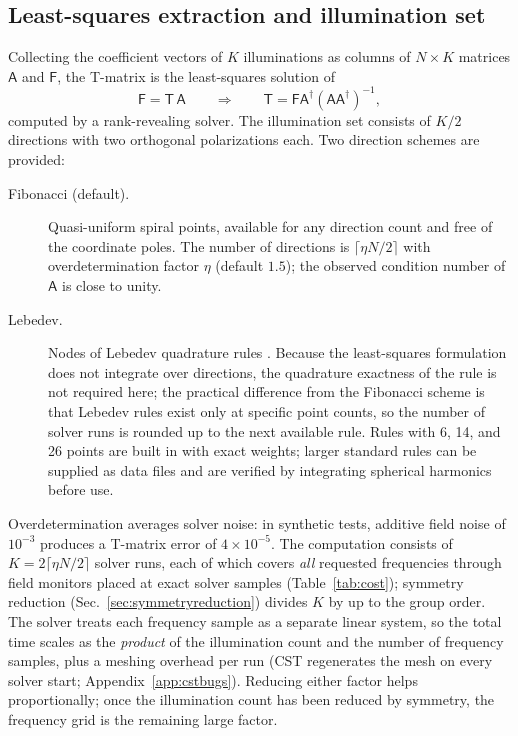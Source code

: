\documentclass[11pt]{article}
\begin{document}
\subsection{Least-squares extraction and illumination set}
\label{sec:lstsq}
Collecting the coefficient vectors of $K$ illuminations as columns of
$N\times K$ matrices $\mathsf{A}$ and $\mathsf{F}$, the T-matrix is the
least-squares solution of
\begin{equation}
\mathsf{F} = \mathsf{T}\,\mathsf{A}
\qquad\Longrightarrow\qquad
\mathsf{T} = \mathsf{F}\mathsf{A}^{\dagger}
 \left(\mathsf{A}\mathsf{A}^{\dagger}\right)^{-1},
\label{eq:lstsq}
\end{equation}
computed by a rank-revealing solver.  The illumination set consists of
$K/2$ directions with two orthogonal polarizations each.  Two direction
schemes are provided:
\begin{description}
\item[Fibonacci (default).]  Quasi-uniform spiral points, available for
any direction count and free of the coordinate poles.  The number of
directions is $\lceil \eta N/2 \rceil$ with overdetermination factor
$\eta$ (default $1.5$); the observed condition number of $\mathsf{A}$ is
close to unity.
\item[Lebedev.]  Nodes of Lebedev quadrature rules \cite{Lebedev1976}.
Because the least-squares formulation does not integrate over directions,
the quadrature exactness of the rule is not required here; the practical
difference from the Fibonacci scheme is that Lebedev rules exist only at
specific point counts, so the number of solver runs is rounded up to the
next available rule.  Rules with 6, 14, and 26 points are built in with
exact weights; larger standard rules can be supplied as data files and
are verified by integrating spherical harmonics before use.
\end{description}
Overdetermination averages solver noise: in synthetic tests, additive
field noise of $10^{-3}$ produces a T-matrix error of
$4\times 10^{-5}$.  The computation consists of
$K = 2\lceil \eta N/2\rceil$ solver runs, each of which
covers \emph{all} requested frequencies through field monitors placed
at exact solver samples (Table~\ref{tab:cost}); symmetry reduction
(Sec.~\ref{sec:symmetryreduction}) divides $K$ by up to the group
order.  The solver treats each frequency sample as a separate linear
system, so the total time scales as the \emph{product} of the
illumination count and the number of frequency samples, plus a meshing
overhead per run (CST regenerates the mesh on every solver start;
Appendix~\ref{app:cstbugs}).  Reducing either factor helps
proportionally; once the illumination count has been reduced by
symmetry, the frequency grid is the remaining large factor.
\end{document}
